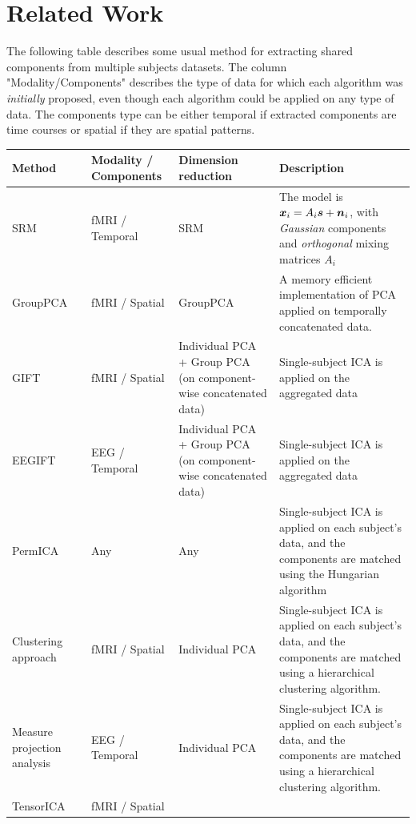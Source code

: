 \section{Related Work}
\label{sec:app_rel_work}
The following table describes some usual method for extracting shared components from multiple subjects datasets.
The column "Modality/Components" describes the type of data for which each algorithm was \emph{initially} proposed, even though each algorithm could be applied on any type of data. 
%
The components type can be either temporal if extracted components are time courses or spatial if they are spatial patterns. 
%
\begin{center}
\begin{longtable}{ |p{} | p{} |p{}| p{}|}
\hline
\textbf{Method} & \textbf{Modality / Components} &\textbf{Dimension reduction} & \textbf{Description}  \\
\hline
SRM \cite{chen2015reduced} & 
fMRI / Temporal
&
SRM
&
The model is $\boldsymbol{x}_i = A_i\boldsymbol{s} + \boldsymbol{n}_i$, with \emph{Gaussian} components and \emph{orthogonal} mixing matrices $A_i$\\
\hline
GroupPCA~\cite{smith2014group} &
fMRI / Spatial
&
GroupPCA
&
A memory efficient implementation of PCA applied on temporally concatenated data.\\
\hline
GIFT~ \cite{calhoun2001method} & 
fMRI / Spatial
&
Individual PCA + Group PCA (on component-wise concatenated data)
&
Single-subject ICA is applied on the aggregated data\\
\hline
EEGIFT~ \cite{eichele2011eegift} & 
EEG / Temporal
&
Individual PCA + Group PCA (on component-wise concatenated data)
&
Single-subject ICA is applied on the aggregated data\\
\hline
PermICA &
Any
&
Any
&
Single-subject ICA is applied on each subject's data, and the components are matched using the Hungarian algorithm\\
\hline
Clustering approach~\cite{esposito2005independent}&
fMRI / Spatial
&
Individual PCA
&
Single-subject ICA is applied on each subject's data, and the components are matched using a hierarchical clustering algorithm.\\
\hline
Measure projection analysis~\cite{bigdely2013measure}&
EEG / Temporal
&
Individual PCA
&
Single-subject ICA is applied on each subject's data, and the components are matched using a hierarchical clustering algorithm.\\
\hline
TensorICA \cite{beckmann2005tensorial} &
fMRI / Spatial

\end{longtable}
\end{center}

